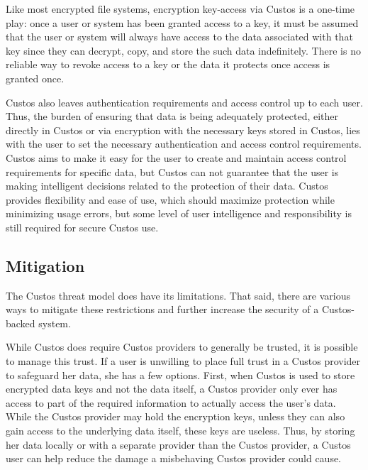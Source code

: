 Like most encrypted file systems, encryption key-access via Custos is
a one-time play: once a user or system has been granted access to a
key, it must be assumed that the user or system will always have
access to the data associated with that key since they can decrypt,
copy, and store the such data indefinitely. There is no reliable way
to revoke access to a key or the data it protects once access is
granted once.

Custos also leaves authentication requirements and access control up
to each user. Thus, the burden of ensuring that data is being
adequately protected, either directly in Custos or via encryption with
the necessary keys stored in Custos, lies with the user to set the
necessary authentication and access control requirements. Custos aims
to make it easy for the user to create and maintain access control
requirements for specific data, but Custos can not guarantee that the
user is making intelligent decisions related to the protection of
their data. Custos provides flexibility and ease of use, which should
maximize protection while minimizing usage errors, but some level of
user intelligence and responsibility is still required for secure
Custos use.

\subsection{Mitigation}

The Custos threat model does have its limitations. That said, there
are various ways to mitigate these restrictions and further increase
the security of a Custos-backed system.

While Custos does require Custos providers to generally be trusted, it
is possible to manage this trust. If a user is unwilling to place full
trust in a Custos provider to safeguard her data, she has a few
options. First, when Custos is used to store encrypted data keys and
not the data itself, a Custos provider only ever has access to part of
the required information to actually access the user's data. While the
Custos provider may hold the encryption keys, unless they can also
gain access to the underlying data itself, these keys are
useless. Thus, by storing her data locally or with a separate provider
than the Custos provider, a Custos user can help reduce the damage a
misbehaving Custos provider could cause.

